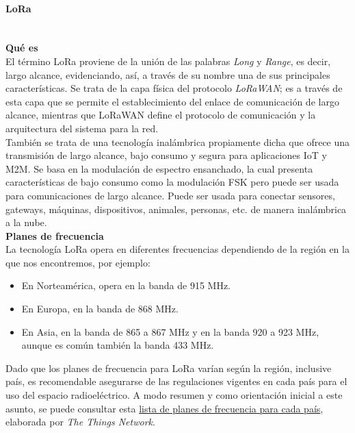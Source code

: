 \documentclass[12pt]{article}
\newcommand{\subsubsubsection}[1]{\paragraph{#1}\mbox{}\\}
\begin{document}
	\subsubsubsection{LoRa}
	
	\noindent \textbf{Qué es}\\
	
	\noindent El término LoRa proviene de la unión de las palabras \textit{Long} y \textit{Range}, es decir, largo alcance, evidenciando, así, a través de su nombre una de sus principales características. Se trata de la capa física del protocolo \textit{LoRaWAN}; es a través de esta capa que se permite el establecimiento del enlace de comunicación de largo alcance, mientras que LoRaWAN define el protocolo de comunicación y la arquitectura del sistema para la red. \\
	
	\noindent También se trata de una tecnología inalámbrica propiamente dicha que ofrece una transmisión de largo alcance, bajo consumo y segura para aplicaciones IoT y M2M. Se basa en la modulación de espectro ensanchado, la cual presenta características de bajo consumo como la modulación FSK pero puede ser usada para comunicaciones de largo alcance. Puede ser usada para conectar sensores, gateways, máquinas, dispositivos, animales, personas, etc. de manera inalámbrica a la nube.\\
	
	\noindent \textbf{Planes de frecuencia} \\
	
	\noindent La tecnología LoRa opera en diferentes frecuencias dependiendo de la región en la que nos encontremos, por ejemplo: \\
	
	\begin{itemize}
		\item En Norteamérica, opera en la banda de 915 MHz.
		\item En Europa, en la banda de 868 MHz.
		\item En Asia, en la banda de 865 a 867 MHz y en la banda 920 a 923 MHz, aunque es común también la banda 433 MHz.
	\end{itemize}
	
	\noindent Dado que los planes de frecuencia para LoRa varían según la región, inclusive país, es recomendable asegurarse de las regulaciones vigentes en cada país para el uso del espacio radioeléctrico. A modo resumen y como orientación inicial a este asunto, se puede consultar esta \href{https://www.thethingsnetwork.org/docs/lorawan/frequencies-by-country/index.html}{lista de planes de frecuencia para cada país}, elaborada por \textit{The Things Network}. \\
	
\end{document}
